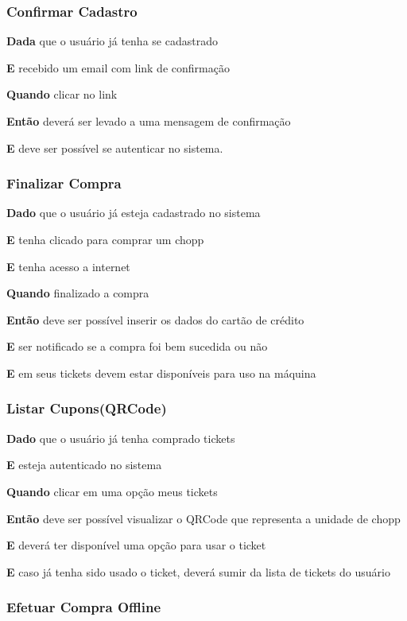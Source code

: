 \subsubsection{Confirmar Cadastro}

\textbf{Dada} que o usuário já tenha se cadastrado

\textbf{E} recebido um email com link de confirmação

\textbf{Quando} clicar no link

\textbf{Então} deverá ser levado a uma mensagem de confirmação

\textbf{E} deve ser possível se autenticar no sistema.

\subsubsection{Finalizar Compra}

\textbf{Dado} que o usuário já esteja cadastrado no sistema

\textbf{E} tenha clicado para comprar um chopp

\textbf{E} tenha acesso a internet

\textbf{Quando} finalizado a compra

\textbf{Então} deve ser possível inserir os dados do cartão de crédito

\textbf{E} ser notificado se a compra foi bem sucedida ou não

\textbf{E} em seus tickets devem estar disponíveis para uso na máquina

\subsubsection{Listar Cupons(QRCode)}

\textbf{Dado} que o usuário já tenha comprado tickets

\textbf{E} esteja autenticado no sistema

\textbf{Quando} clicar em uma opção meus tickets

\textbf{Então} deve ser possível  visualizar o QRCode que representa a unidade de chopp

\textbf{E} deverá ter disponível uma opção para usar o ticket

\textbf{E} caso já tenha sido usado o ticket, deverá sumir da lista de tickets do usuário

\subsubsection{Efetuar Compra Offline}

